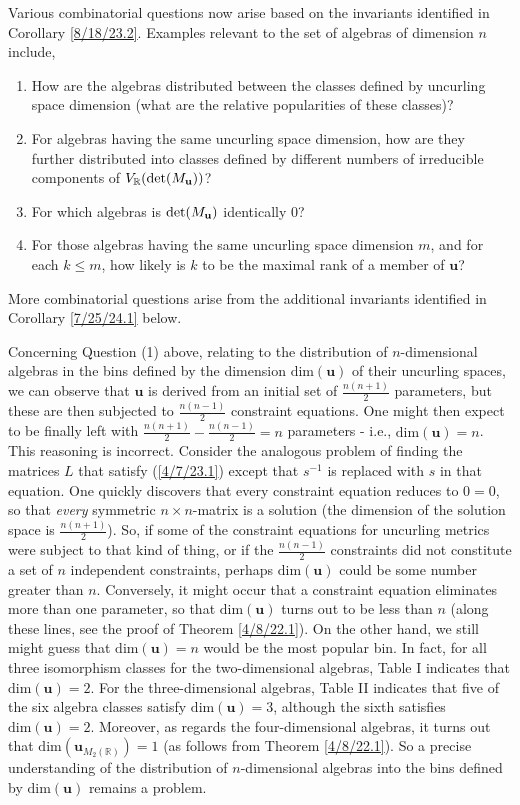 \documentclass{amsart}
\numberwithin{equation}{section}
\theoremstyle{definition}
\numberwithin{theorem}{section}
\begin{document}
Various combinatorial questions now arise based on the invariants identified in Corollary \ref{8/18/23.2}.  Examples relevant to the set of algebras of dimension $n$ include, \begin{enumerate} \item How are the algebras distributed between the classes defined by uncurling space dimension (what are the relative popularities of these classes)?  \item For algebras having the same uncurling space dimension, how are they further distributed into classes defined by different numbers of irreducible components of $V_\mathbb{R}({\rm det}(M_{\mathbf{u}}))$?  \item For which algebras is ${\rm det}(M_{\mathbf{u}})$ identically $0$?   \item For those algebras having the same uncurling space dimension $m$, and for each $k\le m$, how likely is $k$ to be the maximal rank of a member of $\mathbf{u}$?   \end{enumerate}  
More combinatorial questions arise from the additional invariants identified in Corollary \ref{7/25/24.1} below. 

Concerning Question (1) above, relating to the distribution of $n$-dimensional algebras in the bins defined by the dimension $\text{dim}(\mathbf{u})$ of their uncurling spaces, we can observe that $\mathbf{u}$ is derived from an initial set of $\frac{n(n+1)}{2}$ parameters, but these are then subjected to  $\frac{n(n-1)}{2}$ constraint equations.  One might then expect to be finally left with $\frac{n(n+1)}{2} - \frac{n(n-1)}{2} = n$ parameters - i.e., $\text{dim}(\mathbf{u}) = n$.  This reasoning is incorrect.  Consider the analogous problem of finding the matrices $L$ that satisfy (\ref{4/7/23.1}) except that $s^{-1}$ is replaced with $s$ in that equation.  One quickly discovers that every constraint equation reduces to $0=0$, so that {\it every} symmetric $n\times n$-matrix is a solution (the dimension of the solution space is $\frac{n(n+1)}{2}$).  So, if some of the constraint equations for uncurling metrics were subject to  that kind of thing, or if the $\frac{n(n-1)}{2}$ constraints did not constitute a set of $n$ independent constraints, perhaps $\text{dim}(\mathbf{u})$ could be some number greater than $n$.  Conversely, it might occur that a constraint equation eliminates more than one parameter, so that $\text{dim}(\mathbf{u})$ turns out to be less than $n$ (along these lines, see the proof of Theorem \ref{4/8/22.1}).  On the other hand, we still might guess that $\text{dim}(\mathbf{u}) = n$ would be the most popular bin.  In fact, for all three isomorphism classes for the two-dimensional algebras, Table I indicates that $\text{dim}(\mathbf{u}) = 2$.  For the three-dimensional algebras, Table II indicates that five of the six algebra classes satisfy $\text{dim}(\mathbf{u}) = 3$, although the sixth satisfies $\text{dim}(\mathbf{u}) = 2$.  Moreover, as regards the four-dimensional algebras, it turns out that $\text{dim}(\mathbf{u}_{M_2(\mathbb{R})}) = 1$ (as follows from Theorem \ref{4/8/22.1}). So a precise understanding of the distribution of $n$-dimensional algebras into the bins defined by $\text{dim}(\mathbf{u})$ remains a problem.  
\end{document}
